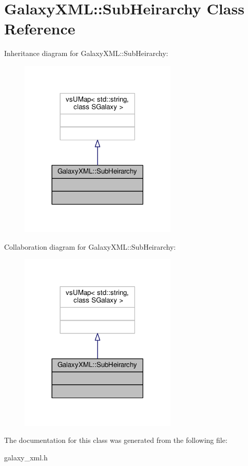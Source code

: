 \hypertarget{classGalaxyXML_1_1SubHeirarchy}{}\section{Galaxy\+X\+ML\+:\+:Sub\+Heirarchy Class Reference}
\label{classGalaxyXML_1_1SubHeirarchy}


Inheritance diagram for Galaxy\+X\+ML\+:\+:Sub\+Heirarchy\+:
\nopagebreak
\begin{figure}[H]
\begin{center}
\leavevmode
\includegraphics[width=213pt]{d2/d1c/classGalaxyXML_1_1SubHeirarchy__inherit__graph}
\end{center}
\end{figure}


Collaboration diagram for Galaxy\+X\+ML\+:\+:Sub\+Heirarchy\+:
\nopagebreak
\begin{figure}[H]
\begin{center}
\leavevmode
\includegraphics[width=213pt]{d3/d14/classGalaxyXML_1_1SubHeirarchy__coll__graph}
\end{center}
\end{figure}


The documentation for this class was generated from the following file\+:\begin{DoxyCompactItemize}
\item 
galaxy\+\_\+xml.\+h\end{DoxyCompactItemize}

